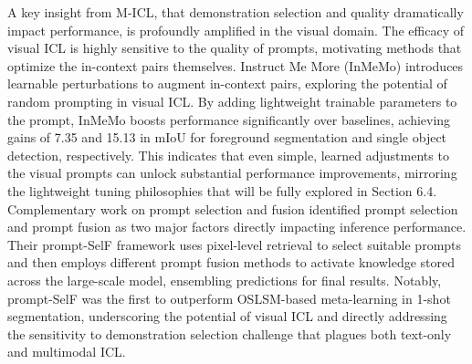 \documentclass[11pt]{article}
\begin{document}
A key insight from M-ICL, that demonstration selection and quality dramatically impact performance, is profoundly amplified in the visual domain. The efficacy of visual ICL is highly sensitive to the quality of prompts, motivating methods that optimize the in-context pairs themselves. Instruct Me More (InMeMo) \cite{ref229} introduces learnable perturbations to augment in-context pairs, exploring the potential of random prompting in visual ICL. By adding lightweight trainable parameters to the prompt, InMeMo boosts performance significantly over baselines, achieving gains of 7.35 and 15.13 in mIoU for foreground segmentation and single object detection, respectively. This indicates that even simple, learned adjustments to the visual prompts can unlock substantial performance improvements, mirroring the lightweight tuning philosophies that will be fully explored in Section 6.4. Complementary work on prompt selection and fusion \cite{ref230} identified prompt selection and prompt fusion as two major factors directly impacting inference performance. Their prompt-SelF framework uses pixel-level retrieval to select suitable prompts and then employs different prompt fusion methods to activate knowledge stored across the large-scale model, ensembling predictions for final results. Notably, prompt-SelF was the first to outperform OSLSM-based meta-learning in 1-shot segmentation, underscoring the potential of visual ICL and directly addressing the sensitivity to demonstration selection challenge that plagues both text-only and multimodal ICL.
\end{document}
